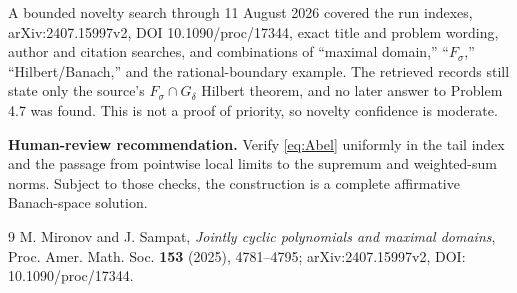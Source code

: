 \documentclass[11pt]{article}
\begin{document}
A bounded novelty search through 11 August 2026 covered the run indexes,
arXiv:2407.15997v2, DOI 10.1090/proc/17344, exact title and problem wording,
author and citation searches, and combinations of ``maximal domain,''
``$F_\sigma$,'' ``Hilbert/Banach,'' and the rational-boundary example.  The
retrieved records still state only the source's $F_\sigma\cap G_\delta$
Hilbert theorem, and no later answer to Problem 4.7 was found.  This is not a
proof of priority, so novelty confidence is moderate.

\medskip
\noindent\textbf{Human-review recommendation.} Verify \eqref{eq:Abel} uniformly
in the tail index and the passage from pointwise local limits to the
supremum and weighted-sum norms.  Subject to those checks, the construction
is a complete affirmative Banach-space solution.

\begin{thebibliography}{9}
M. Mironov and J. Sampat,
\emph{Jointly cyclic polynomials and maximal domains},
Proc. Amer. Math. Soc. \textbf{153} (2025), 4781--4795;
arXiv:2407.15997v2, DOI: 10.1090/proc/17344.
\end{thebibliography}
\end{document}
